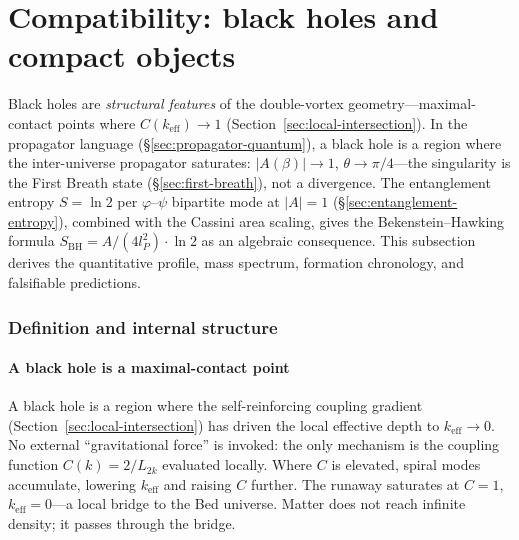 \documentclass[12pt,a4paper]{article}
\newcommand{\bed}{Bed universe}
\begin{document}


\section{Compatibility: black holes and compact objects}
\label{sec:black-holes-domain}
\label{sec:black-holes}

Black holes are \emph{structural features} of the double-vortex geometry---maximal-contact points where $C(k_{\mathrm{eff}}) \to 1$ (Section~\ref{sec:local-intersection}).  In the propagator language (\S\ref{sec:propagator-quantum}), a black hole is a region where the inter-universe propagator saturates: $|A(\beta)| \to 1$, $\theta \to \pi/4$---the singularity is the First Breath state (\S\ref{sec:first-breath}), not a divergence.  The entanglement entropy $S = \ln 2$ per $\varphi$--$\psi$ bipartite mode at $|A| = 1$ (\S\ref{sec:entanglement-entropy}), combined with the Cassini area scaling, gives the Bekenstein--Hawking formula $S_{\mathrm{BH}} = A/(4l_P^2) \cdot \ln 2$ as an algebraic consequence.  This subsection derives the quantitative profile, mass spectrum, formation chronology, and falsifiable predictions.


\subsubsection{Definition and internal structure}
\label{sec:bh-definition}

\paragraph{A black hole is a maximal-contact point}

A black hole is a region where the self-reinforcing coupling gradient (Section~\ref{sec:local-intersection}) has driven the local effective depth to $k_{\mathrm{eff}} \to 0$.  No external ``gravitational force'' is invoked: the only mechanism is the coupling function $C(k) = 2/L_{2k}$ evaluated locally.  Where $C$ is elevated, spiral modes accumulate, lowering $k_{\mathrm{eff}}$ and raising $C$ further.  The runaway saturates at $C = 1$, $k_{\mathrm{eff}} = 0$---a local bridge to the \bed{}.  Matter does not reach infinite density; it passes through the bridge.
\end{document}
